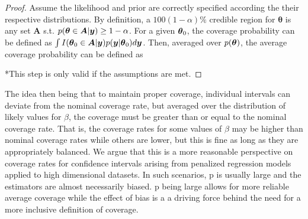 \begin{proof}
Assume the likelihood and prior are correctly specified according the their respective distributions. By definition, a $100(1-\alpha)\%$ credible region for $\boldsymbol{\theta}$ is any set $\boldsymbol{A}$ s.t. $p(\boldsymbol{\theta} \in \boldsymbol{A} | \boldsymbol{y}) \geq 1 - \alpha$. For a given $\boldsymbol{\theta}_0$, the coverage probability can be defined as $\int I(\boldsymbol{\theta}_0 \in \boldsymbol{A} | \boldsymbol{y}) p(\boldsymbol{y} | \boldsymbol{\theta}_0)d\boldsymbol{y}$. Then, averaged over $p(\boldsymbol{\theta})$, the average coverage probability can be defined as


*This step is only valid if the assumptions are met.
\end{proof}
The idea then being that to maintain proper coverage, individual intervals can deviate from the nominal coverage rate, but averaged over the distribution of likely values for $\beta$, the coverage must be greater than or equal to the nominal coverage rate. That is, the coverage rates for some values of $\beta$ may be higher than nominal coverage rates while others are lower, but this is fine as long as they are appropriately balanced. We argue that this is a more reasonable perspective on coverage rates for confidence intervals arising from penalized regression models applied to high dimensional datasets. In such scenarios, p is usually large and the estimators are almost necessarily biased. p being large allows for more reliable average coverage while the effect of bias is a a driving force behind the need for a more inclusive definition of coverage.

